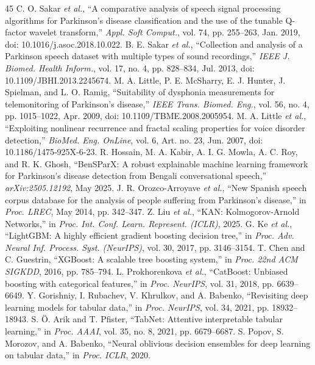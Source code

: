 \documentclass[journal,10pt,twoside]{IEEEtran}
\begin{document}
\begin{thebibliography}{45}
 C. O. Sakar \textit{et al.}, ``A comparative analysis of speech signal processing algorithms for Parkinson's disease classification and the use of the tunable Q-factor wavelet transform,'' \textit{Appl. Soft Comput.}, vol. 74, pp. 255--263, Jan. 2019, doi: 10.1016/j.asoc.2018.10.022.
 B. E. Sakar \textit{et al.}, ``Collection and analysis of a Parkinson speech dataset with multiple types of sound recordings,'' \textit{IEEE J. Biomed. Health Inform.}, vol. 17, no. 4, pp. 828--834, Jul. 2013, doi: 10.1109/JBHI.2013.2245674.
 M. A. Little, P. E. McSharry, E. J. Hunter, J. Spielman, and L. O. Ramig, ``Suitability of dysphonia measurements for telemonitoring of Parkinson's disease,'' \textit{IEEE Trans. Biomed. Eng.}, vol. 56, no. 4, pp. 1015--1022, Apr. 2009, doi: 10.1109/TBME.2008.2005954.
 M. A. Little \textit{et al.}, ``Exploiting nonlinear recurrence and fractal scaling properties for voice disorder detection,'' \textit{BioMed. Eng. OnLine}, vol. 6, Art. no. 23, Jun. 2007, doi: 10.1186/1475-925X-6-23.
 R. Hossain, M. A. Kabir, A. I. G. Mowla, A. C. Roy, and R. K. Ghosh, ``BenSParX: A robust explainable machine learning framework for Parkinson's disease detection from Bengali conversational speech,'' \textit{arXiv:2505.12192}, May 2025.
 J. R. Orozco-Arroyave \textit{et al.}, ``New Spanish speech corpus database for the analysis of people suffering from Parkinson's disease,'' in \textit{Proc. LREC}, May 2014, pp. 342--347.
 Z. Liu \textit{et al.}, ``KAN: Kolmogorov-Arnold Networks,'' in \textit{Proc. Int. Conf. Learn. Represent. (ICLR)}, 2025.
 G. Ke \textit{et al.}, ``LightGBM: A highly efficient gradient boosting decision tree,'' in \textit{Proc. Adv. Neural Inf. Process. Syst. (NeurIPS)}, vol. 30, 2017, pp. 3146--3154.
 T. Chen and C. Guestrin, ``XGBoost: A scalable tree boosting system,'' in \textit{Proc. 22nd ACM SIGKDD}, 2016, pp. 785--794.
 L. Prokhorenkova \textit{et al.}, ``CatBoost: Unbiased boosting with categorical features,'' in \textit{Proc. NeurIPS}, vol. 31, 2018, pp. 6639--6649.
 Y. Gorishniy, I. Rubachev, V. Khrulkov, and A. Babenko, ``Revisiting deep learning models for tabular data,'' in \textit{Proc. NeurIPS}, vol. 34, 2021, pp. 18932--18943.
 S. \"{O}. Arik and T. Pfister, ``TabNet: Attentive interpretable tabular learning,'' in \textit{Proc. AAAI}, vol. 35, no. 8, 2021, pp. 6679--6687.
 S. Popov, S. Morozov, and A. Babenko, ``Neural oblivious decision ensembles for deep learning on tabular data,'' in \textit{Proc. ICLR}, 2020.

\end{thebibliography}
\end{document}
